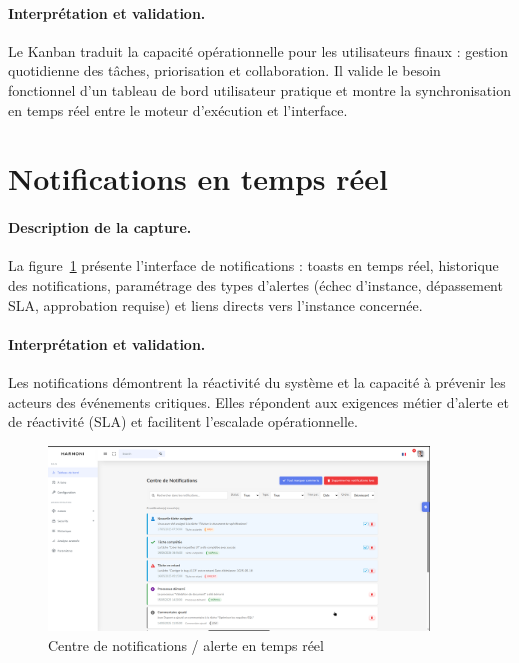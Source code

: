 \paragraph{Interprétation et validation.}  
Le Kanban traduit la capacité opérationnelle pour les utilisateurs finaux : gestion quotidienne des tâches, priorisation et collaboration. Il valide le besoin fonctionnel d’un tableau de bord utilisateur pratique et montre la synchronisation en temps réel entre le moteur d’exécution et l’interface.

\section{Notifications en temps réel}

\paragraph{Description de la capture.}  
La figure~\ref{fig:notification} présente l’interface de notifications : toasts en temps réel, historique des notifications, paramétrage des types d’alertes (échec d’instance, dépassement SLA, approbation requise) et liens directs vers l’instance concernée.

\paragraph{Interprétation et validation.}  
Les notifications démontrent la réactivité du système et la capacité à prévenir les acteurs des événements critiques. Elles répondent aux exigences métier d’alerte et de réactivité (SLA) et facilitent l’escalade opérationnelle.
\begin{figure}[H]
    \centering
    \includegraphics[width=0.9\textwidth]{Images/notification.png}
    \caption{Centre de notifications / alerte en temps réel}
    \label{fig:notification}
\end{figure}


